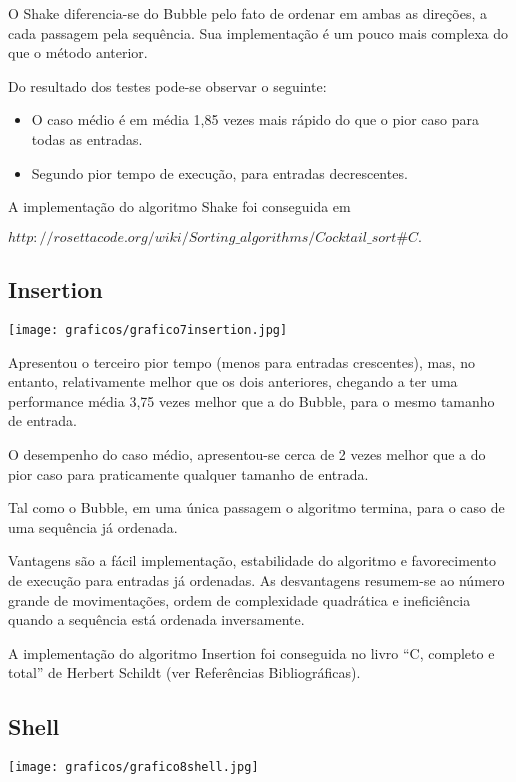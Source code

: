 \documentclass[12pt,a4paper]{article}
\begin{document}
O Shake diferencia-se do Bubble pelo fato de ordenar em ambas as direções, a cada passagem pela sequência. Sua implementação é um pouco mais complexa do que o método anterior.

Do resultado dos testes pode-se observar o seguinte:
\begin{itemize}
\item O caso médio é em média 1,85 vezes mais rápido do que o pior caso para todas as entradas.
\item Segundo pior tempo de execução, para entradas decrescentes.
\end{itemize}


A implementação do algoritmo Shake foi conseguida em 

$http://rosettacode.org/wiki/Sorting\_algorithms/Cocktail\_sort\#C.$





\subsection{Insertion}
\begin{center}
\texttt{[image: graficos/grafico7insertion.jpg]}
\end{center}

Apresentou o terceiro pior tempo (menos para entradas crescentes), mas, no entanto, relativamente melhor que os dois anteriores, chegando a ter uma performance média 3,75 vezes melhor que a do Bubble, para o mesmo tamanho de entrada. 

O desempenho do caso médio, apresentou-se cerca de 2 vezes melhor que a do pior caso para praticamente qualquer tamanho de entrada. 

Tal como o Bubble, em uma única passagem o algoritmo termina, para o caso de uma sequência já ordenada. 

Vantagens são a fácil implementação, estabilidade do algoritmo e favorecimento de execução para entradas já ordenadas. As desvantagens resumem-se ao número grande de movimentações, ordem de complexidade quadrática e ineficiência quando a sequência está ordenada inversamente. 

A implementação do algoritmo Insertion foi conseguida no livro “C, completo e total” de Herbert Schildt (ver Referências Bibliográficas).






\subsection{Shell}
\begin{center}
\texttt{[image: graficos/grafico8shell.jpg]}
\end{center}
\end{document}
